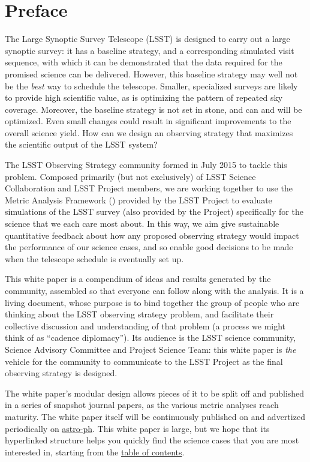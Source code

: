 \setcounter{chapter}{0}
\chapter*{Preface}
\def\chpname{preface}\label{chp:\chpname}
\markboth{}{}

\noindent The Large Synoptic Survey Telescope (LSST) is designed to
carry out a large synoptic survey: it has a baseline strategy, and a
corresponding simulated visit sequence, with which it can be
demonstrated that the data required for the promised science can be
delivered. However, this baseline strategy may well not be the {\it
best} way to schedule the telescope. Smaller, specialized surveys are
likely to provide high scientific value, as is optimizing the pattern of
repeated sky coverage.  Moreover, the baseline strategy is not set in
stone, and can and will be optimized. Even small changes could result in
significant improvements to the overall science yield. How can we design
an observing strategy that maximizes the scientific output of the LSST
system?

\noindent The LSST Observing Strategy community formed in July 2015 to
tackle this problem. Composed primarily (but not exclusively) of  LSST
Science Collaboration and LSST Project members, we are working together
to use the Metric Analysis Framework (\MAF) provided by the LSST Project
to evaluate \OpSim simulations of the LSST survey (also provided by the
Project) specifically for the science that we each care most about. In
this way, we aim give sustainable quantitative feedback about how any
proposed observing strategy would impact the performance of our science
cases, and so enable good decisions to be made when the telescope
schedule is eventually set up.

\noindent This white paper is a compendium of ideas and results
generated by the community, assembled so that everyone can follow along
with the analysis. It is a living document, whose purpose is to bind
together the group of people who are thinking about the LSST observing
strategy problem, and facilitate their collective discussion and
understanding of that problem (a process we might think of as  ``cadence
diplomacy''). Its audience is the LSST science community, Science
Advisory Committee and Project Science Team: this white paper is   {\it
the} vehicle for the community to communicate to the LSST Project as the
final observing strategy is designed.

\noindent The white paper's modular design allows pieces of it to be
split off and published in a series of snapshot journal papers, as the
various metric analyses reach maturity. The white paper itself will be
continuously published on
\href{https://github.com/LSSTScienceCollaborations/ObservingStrategy}{\GitHub}
and advertized periodically on \href{http://arxiv.org}{astro-ph}. This
white paper is large, but we hope that its hyperlinked structure helps
you quickly find the science cases that you are most interested in,
starting from the \hyperref[toc]{table of contents}.

